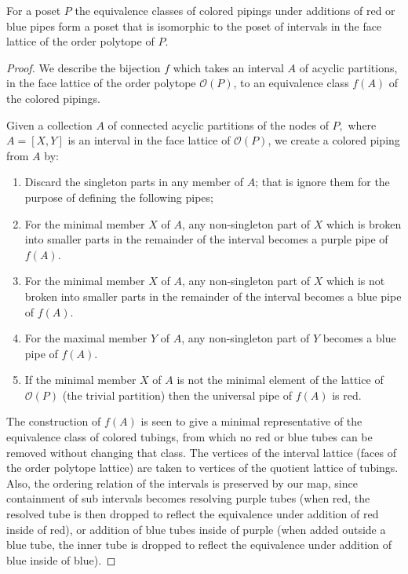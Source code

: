 \documentclass{article}
\begin{document}
\begin{theorem}\label{th:two}
    For a poset $P$ the equivalence classes of colored pipings under additions of red or blue pipes form a poset that is isomorphic to the poset of intervals in the face lattice of the order polytope of $P.$
\end{theorem}
\begin{proof}

  We describe the bijection $f$ which takes an interval $A$ of acyclic partitions, in the face lattice of the order polytope $\mathcal{O}(P)$, to an equivalence class $f(A)$ of the colored pipings.

   Given a collection $A$ of connected acyclic partitions of the nodes of $P,$ where $A = [X,Y]$ is an interval in the face lattice of $\mathcal{O}(P)$, we create a colored piping from $A$ by: 
  \begin{enumerate}
      \item Discard the singleton parts in any member of $A$; that is ignore them for the purpose of defining the following pipes;
      \item  For the minimal member $X$ of $A$, any non-singleton part of $X$ which is broken into smaller parts in the remainder of the interval becomes a purple pipe of  $f(A).$
      \item For the minimal member $X$ of $A$, any non-singleton part of $X$ which is not broken into smaller parts in the remainder of the interval becomes a blue pipe of  $f(A).$
      \item For the maximal member $Y$ of $A$, any non-singleton part of $Y$ becomes a blue pipe of $f(A).$
      \item If the minimal member $X$ of $A$ is not the minimal element of the lattice of $\mathcal{O}(P)$ (the trivial partition) then the universal pipe of $f(A)$ is red. 
   \end{enumerate}
      The construction of $f(A)$ is seen to give a minimal representative of the equivalence class of colored tubings, from which no red or blue tubes can be removed without changing that class.  The vertices of the interval lattice (faces of the order polytope lattice) are taken to vertices of the quotient lattice of tubings. Also, the ordering relation of the intervals is preserved by our map, since containment of sub intervals becomes resolving purple tubes (when red, the resolved tube is then dropped to reflect the equivalence under addition of red inside of red), or addition of blue tubes inside of purple  (when added outside a blue tube, the inner tube is dropped to reflect the equivalence under addition of blue inside of blue).
\end{proof}
\end{document}
